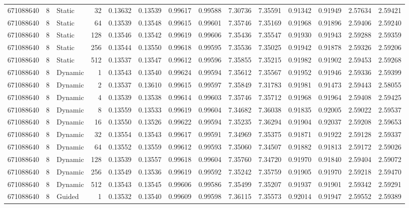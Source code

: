 \begin{tabular}{rrlrrrrrrrrrrr}
671088640 & 8 & Static & 32 & 0.13632 & 0.13539 & 0.99617 & 0.99588 & 7.30736 & 7.35591 & 0.91342 & 0.91949 & 2.57634 & 2.59421 \\
671088640 & 8 & Static & 64 & 0.13539 & 0.13548 & 0.99615 & 0.99601 & 7.35746 & 7.35169 & 0.91968 & 0.91896 & 2.59406 & 2.59240 \\
671088640 & 8 & Static & 128 & 0.13546 & 0.13542 & 0.99619 & 0.99606 & 7.35436 & 7.35547 & 0.91930 & 0.91943 & 2.59288 & 2.59359 \\
671088640 & 8 & Static & 256 & 0.13544 & 0.13550 & 0.99618 & 0.99595 & 7.35536 & 7.35025 & 0.91942 & 0.91878 & 2.59326 & 2.59206 \\
671088640 & 8 & Static & 512 & 0.13537 & 0.13547 & 0.99612 & 0.99596 & 7.35855 & 7.35215 & 0.91982 & 0.91902 & 2.59453 & 2.59268 \\
671088640 & 8 & Dynamic & 1 & 0.13543 & 0.13540 & 0.99624 & 0.99594 & 7.35612 & 7.35567 & 0.91952 & 0.91946 & 2.59336 & 2.59399 \\
671088640 & 8 & Dynamic & 2 & 0.13537 & 0.13610 & 0.99615 & 0.99597 & 7.35849 & 7.31783 & 0.91981 & 0.91473 & 2.59443 & 2.58055 \\
671088640 & 8 & Dynamic & 4 & 0.13539 & 0.13538 & 0.99614 & 0.99603 & 7.35746 & 7.35712 & 0.91968 & 0.91964 & 2.59408 & 2.59425 \\
671088640 & 8 & Dynamic & 8 & 0.13559 & 0.13533 & 0.99619 & 0.99604 & 7.34682 & 7.36038 & 0.91835 & 0.92005 & 2.59022 & 2.59537 \\
671088640 & 8 & Dynamic & 16 & 0.13550 & 0.13526 & 0.99622 & 0.99594 & 7.35235 & 7.36294 & 0.91904 & 0.92037 & 2.59208 & 2.59653 \\
671088640 & 8 & Dynamic & 32 & 0.13554 & 0.13543 & 0.99617 & 0.99591 & 7.34969 & 7.35375 & 0.91871 & 0.91922 & 2.59128 & 2.59337 \\
671088640 & 8 & Dynamic & 64 & 0.13552 & 0.13559 & 0.99612 & 0.99593 & 7.35060 & 7.34507 & 0.91882 & 0.91813 & 2.59172 & 2.59026 \\
671088640 & 8 & Dynamic & 128 & 0.13539 & 0.13557 & 0.99618 & 0.99604 & 7.35760 & 7.34720 & 0.91970 & 0.91840 & 2.59404 & 2.59072 \\
671088640 & 8 & Dynamic & 256 & 0.13549 & 0.13536 & 0.99619 & 0.99592 & 7.35242 & 7.35759 & 0.91905 & 0.91970 & 2.59218 & 2.59470 \\
671088640 & 8 & Dynamic & 512 & 0.13543 & 0.13545 & 0.99606 & 0.99586 & 7.35499 & 7.35207 & 0.91937 & 0.91901 & 2.59342 & 2.59291 \\
671088640 & 8 & Guided & 1 & 0.13532 & 0.13540 & 0.99609 & 0.99598 & 7.36115 & 7.35573 & 0.92014 & 0.91947 & 2.59552 & 2.59389 \\

\end{tabular}
